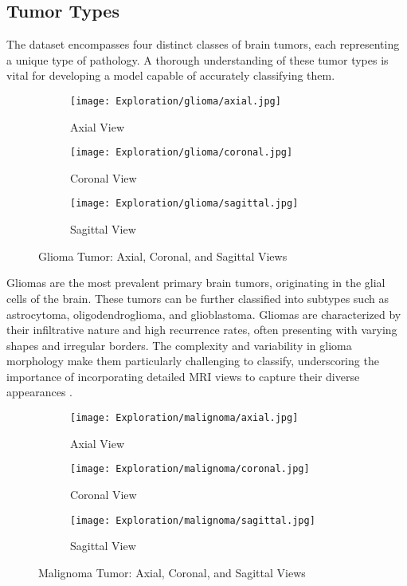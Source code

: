 \subsection{Tumor Types}\label{tumor_types}

The dataset encompasses four distinct classes of brain tumors, each representing a unique type of pathology. A thorough understanding of these tumor types is vital for developing a model capable of accurately classifying them.

\begin{figure}[H]
  \centering
  \begin{subfigure}[b]{0.15\textwidth}
    \centering
    \texttt{[image: Exploration/glioma/axial.jpg]}
    \caption{Axial View}
    \label{fig:glioma_axial}
  \end{subfigure}
  \begin{subfigure}[b]{0.15\textwidth}
    \centering
    \texttt{[image: Exploration/glioma/coronal.jpg]}
    \caption{Coronal View}
    \label{fig:glioma_coronal}
  \end{subfigure}
  \begin{subfigure}[b]{0.15\textwidth}
    \centering
    \texttt{[image: Exploration/glioma/sagittal.jpg]}
    \caption{Sagittal View}
    \label{fig:glioma_sagittal}
  \end{subfigure}
  \caption{Glioma Tumor: Axial, Coronal, and Sagittal Views}
  \label{fig:glioma_views}
\end{figure}

Gliomas are the most prevalent primary brain tumors, originating in the glial cells of the brain. These tumors can be further classified into subtypes such as astrocytoma, oligodendroglioma, and glioblastoma. Gliomas are characterized by their infiltrative nature and high recurrence rates, often presenting with varying shapes and irregular borders. The complexity and variability in glioma morphology make them particularly challenging to classify, underscoring the importance of incorporating detailed MRI views to capture their diverse appearances \cite{abd-ellah_automatic_2024}.

\begin{figure}[H]
  \centering
  \begin{subfigure}[b]{0.15\textwidth}
    \centering
    \texttt{[image: Exploration/malignoma/axial.jpg]}
    \caption{Axial View}
    \label{fig:malignoma_axial}
  \end{subfigure}
  \begin{subfigure}[b]{0.15\textwidth}
    \centering
    \texttt{[image: Exploration/malignoma/coronal.jpg]}
    \caption{Coronal View}
    \label{fig:malignoma_coronal}
  \end{subfigure}
  \begin{subfigure}[b]{0.15\textwidth}
    \centering
    \texttt{[image: Exploration/malignoma/sagittal.jpg]}
    \caption{Sagittal View}
    \label{fig:malignoma_sagittal}
  \end{subfigure}
  \caption{Malignoma Tumor: Axial, Coronal, and Sagittal Views}
  \label{fig:malignoma_views}
\end{figure}

